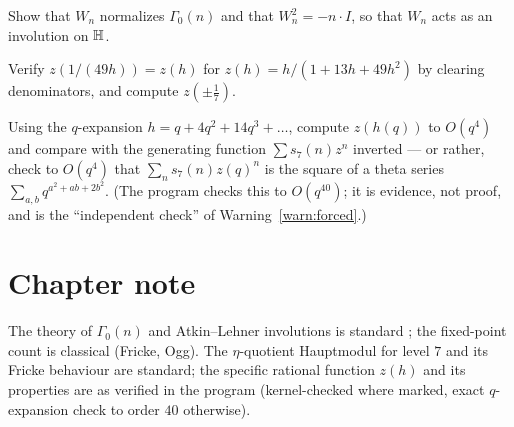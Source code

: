 \begin{exercise}
Show that $W_n$ normalizes $\Gamma_0(n)$ and that $W_n^2=-n\cdot I$, so that
$W_n$ acts as an involution on $\mathbb{H}$.
\end{exercise}

\begin{exercise}[$\star$]
Verify $z(1/(49h))=z(h)$ for $z(h)=h/(1+13h+49h^2)$ by clearing
denominators, and compute $z(\pm\tfrac17)$.
\end{exercise}

\begin{exercise}
Using the $q$-expansion $h=q+4q^2+14q^3+\dots$, compute $z(h(q))$ to
$O(q^4)$ and compare with the generating function $\sum s_7(n)z^n$ inverted
--- or rather, check to $O(q^4)$ that $\sum_n s_7(n)z(q)^n$ is the square of
a theta series $\sum_{a,b}q^{a^2+ab+2b^2}$. (The program checks this to
$O(q^{40})$; it is evidence, not proof, and is the ``independent check'' of
Warning~\ref{warn:forced}.)
\end{exercise}

\section*{Chapter note}

The theory of $\Gamma_0(n)$ and Atkin--Lehner involutions is standard
\cite{DiamondShurman2005,AtkinLehner1970}; the fixed-point count is classical
(Fricke, Ogg). The $\eta$-quotient Hauptmodul for level $7$ and its Fricke
behaviour are standard; the specific rational function $z(h)$ and its
properties are as verified in the program (kernel-checked where marked, exact
$q$-expansion check to order $40$ otherwise).
